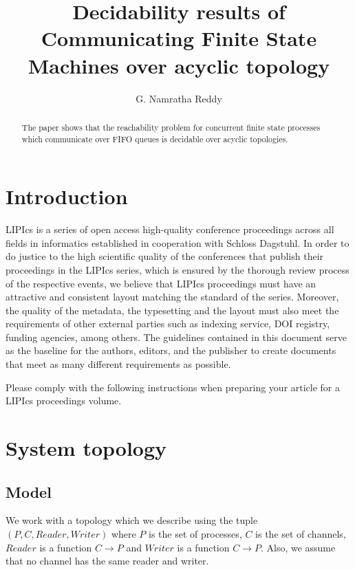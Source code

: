 \documentclass[a4paper,UKenglish,cleveref, autoref, thm-restate]{lipics-v2019}
\title{Decidability results of Communicating Finite
State Machines over acyclic topology } %
\author{G. Namratha Reddy}{Chennai Mathematical Institute, India \and  \url{http://www.cmi.ac.in/~namratha} }{}{}{}
\begin{document}
\maketitle

\begin{abstract}
    The paper shows that the reachability problem for concurrent finite state processes which communicate over FIFO queues is decidable over acyclic topologies. 
\end{abstract}

\section{Introduction}
\label{sec:typesetting-summary}

LIPIcs is a series of open access high-quality conference proceedings across all fields in informatics established in cooperation with Schloss Dagstuhl. 
In order to do justice to the high scientific quality of the conferences that publish their proceedings in the LIPIcs series, which is ensured by the thorough review process of the respective events, we believe that LIPIcs proceedings must have an attractive and consistent layout matching the standard of the series.
Moreover, the quality of the metadata, the typesetting and the layout must also meet the requirements of other external parties such as indexing service, DOI registry, funding agencies, among others. The guidelines contained in this document serve as the baseline for the authors, editors, and the publisher to create documents that meet as many different requirements as possible. 

Please comply with the following instructions when preparing your article for a LIPIcs proceedings volume. 


\section{System topology}

\subsection{Model}

We work with a topology which we describe using the tuple $(P, C, Reader, Writer)$ where $P$ is the set of processes, $C$ is the set of channels, $Reader$ is a function $C \rightarrow P$ and $Writer$ is a function $C \rightarrow P$. 
Also, we assume that no channel has the same reader and writer.
\end{document}
